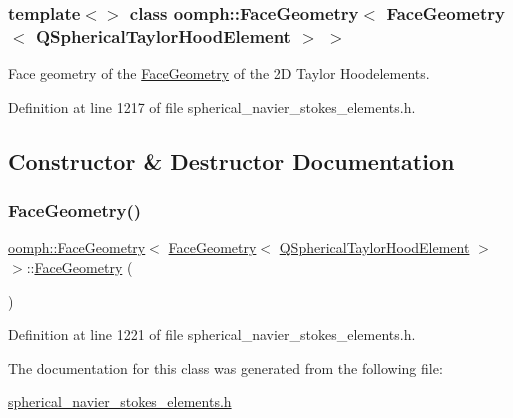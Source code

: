 \subsubsection*{template$<$$>$\newline
class oomph\+::\+Face\+Geometry$<$ Face\+Geometry$<$ Q\+Spherical\+Taylor\+Hood\+Element $>$ $>$}

Face geometry of the \hyperlink{classoomph_1_1FaceGeometry}{Face\+Geometry} of the 2D Taylor Hoodelements. 

Definition at line 1217 of file spherical\+\_\+navier\+\_\+stokes\+\_\+elements.\+h.



\subsection{Constructor \& Destructor Documentation}
\mbox{\label{classoomph_1_1FaceGeometry_3_01FaceGeometry_3_01QSphericalTaylorHoodElement_01_4_01_4_ad84b078cb737437e098c8da13da598c5}} 
\subsubsection{\texorpdfstring{Face\+Geometry()}{FaceGeometry()}}
{\footnotesize\ttfamily \hyperlink{classoomph_1_1FaceGeometry}{oomph\+::\+Face\+Geometry}$<$ \hyperlink{classoomph_1_1FaceGeometry}{Face\+Geometry}$<$ \hyperlink{classoomph_1_1QSphericalTaylorHoodElement}{Q\+Spherical\+Taylor\+Hood\+Element} $>$ $>$\+::\hyperlink{classoomph_1_1FaceGeometry}{Face\+Geometry} (\begin{DoxyParamCaption}{ }\end{DoxyParamCaption})\hspace{0.3cm}{\ttfamily [inline]}}



Definition at line 1221 of file spherical\+\_\+navier\+\_\+stokes\+\_\+elements.\+h.



The documentation for this class was generated from the following file\+:\begin{DoxyCompactItemize}
\item 
\hyperlink{spherical__navier__stokes__elements_8h}{spherical\+\_\+navier\+\_\+stokes\+\_\+elements.\+h}\end{DoxyCompactItemize}
